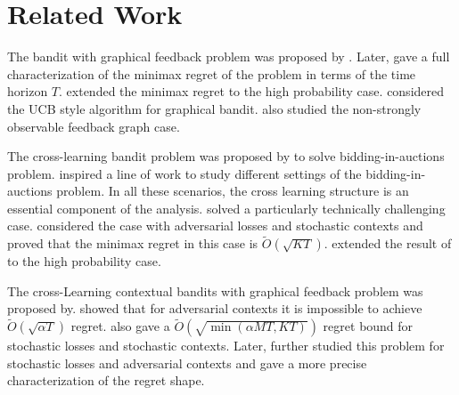 \section{Related Work}
The bandit with graphical feedback problem was proposed by \citet{MS11}.
%
Later, \citet{GraphAlon15} gave a full characterization of the minimax regret of the problem in terms of the time horizon $T$.  \citet{neu2015,LuoGraph23} extended the minimax regret to the high probability case.
%
\citet{lykouris20a,Han24} considered the UCB style algorithm for graphical bandit.
%
\citet{GraphAlon15,Understanding2021} also studied the non-strongly observable feedback graph case.

The cross-learning bandit problem was proposed by \citet{Bal19} to solve bidding-in-auctions problem. \citet{Bal19} inspired a line of work to study different settings of the bidding-in-auctions problem\citep{Han2020Adversarial,Aiauction,WangAuction,Han24}. In all these scenarios, the cross learning structure is an essential component of the analysis. \citet{Sch23} solved a particularly technically challenging case. \citet{Sch23} considered the case with adversarial losses and stochastic contexts and proved that the minimax regret in this case is $\widetilde{O}(\sqrt{KT})$. \citet{Huang2025} extended the result of \citet{Sch23} to the high probability case.

The cross-Learning contextual bandits with graphical feedback problem was proposed by\citet{Han24}. \citet{Han24} showed that for adversarial contexts it is impossible to achieve $\widetilde{O}(\sqrt{\alpha T})$ regret. \citet{Han24} also gave a $\widetilde{O}(\sqrt{\min(\alpha MT,KT)})$ regret bound for stochastic losses and stochastic contexts. Later, \citet{MAS24} further studied this problem for stochastic losses and adversarial contexts and gave a more precise characterization of the regret shape.